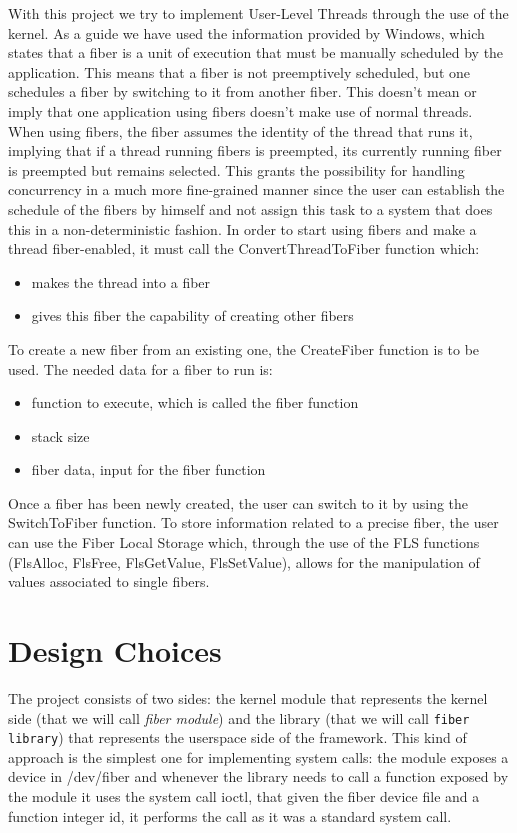 \documentclass[a4paper,10pt]{article}
\begin{document}
With this project we try to implement User-Level Threads through the use of the kernel. As a guide we have used the information provided by Windows, which states that a fiber is a unit of execution that must be manually scheduled by the application. This means that a fiber is not preemptively scheduled, but one schedules a fiber by switching to it from another fiber. This doesn’t mean or imply that one application using fibers doesn’t make use of normal threads. When using fibers, the fiber assumes the identity of the thread that runs it, implying that if a thread running fibers is preempted, its currently running fiber is preempted but remains selected. This grants the possibility for handling concurrency in a much more fine-grained manner since the user can establish the schedule of the fibers by himself and not assign this task to a system that does this in a non-deterministic fashion.
In order to start using fibers and make a thread fiber-enabled, it must call the ConvertThreadToFiber function which:
\begin{itemize}
	\item makes the thread into a fiber
	\item gives this fiber the capability of creating other fibers
\end{itemize}
To create a new fiber from an existing one, the CreateFiber function is to be used. The needed data for a fiber to run is:
\begin{itemize}
	\item function to execute, which is called the fiber function
	\item stack size
	\item fiber data, input for the fiber function
\end{itemize}

Once a fiber has been newly created, the user can switch to it by using the SwitchToFiber function.
To store information related to a precise fiber, the user can use the Fiber Local Storage which, through the use of the FLS functions (FlsAlloc, FlsFree, FlsGetValue, FlsSetValue), allows for the manipulation of values associated to single fibers.

\section{Design Choices}
The project consists of two sides: the kernel module that represents the kernel side (that we will call \textit{fiber module}) and the library (that we will call \texttt{fiber library}) that represents the userspace side of the framework. This kind of approach is the simplest one for implementing system calls: the module exposes a device in /dev/fiber and whenever the library needs to call a function exposed by the module it uses the system call ioctl, that given the fiber device file and a function integer id, it performs the call as it was a standard system call.
\end{document}
